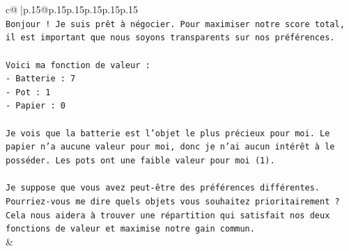 \documentclass{article}
\begin{document}
{\begin{supertabular}{c@{$\;$}|p{.15\linewidth}@{}p{.15\linewidth}p{.15\linewidth}p{.15\linewidth}p{.15\linewidth}p{.15\linewidth}}
{{{\\ 
\texttt{Bonjour ! Je suis prêt à négocier. Pour maximiser notre score total, il est important que nous soyons transparents sur nos préférences.} \\
\\ 
\texttt{Voici ma fonction de valeur :} \\
\texttt{{-} Batterie : 7} \\
\texttt{{-} Pot : 1} \\
\texttt{{-} Papier : 0} \\
\\ 
\texttt{Je vois que la batterie est l'objet le plus précieux pour moi. Le papier n'a aucune valeur pour moi, donc je n'ai aucun intérêt à le posséder. Les pots ont une faible valeur pour moi (1).} \\
\\ 
\texttt{Je suppose que vous avez peut{-}être des préférences différentes. Pourriez{-}vous me dire quels objets vous souhaitez prioritairement ? Cela nous aidera à trouver une répartition qui satisfait nos deux fonctions de valeur et maximise notre gain commun.} \\
            }
        }
    }
    & \\ \\


\end{supertabular}}
\end{document}
